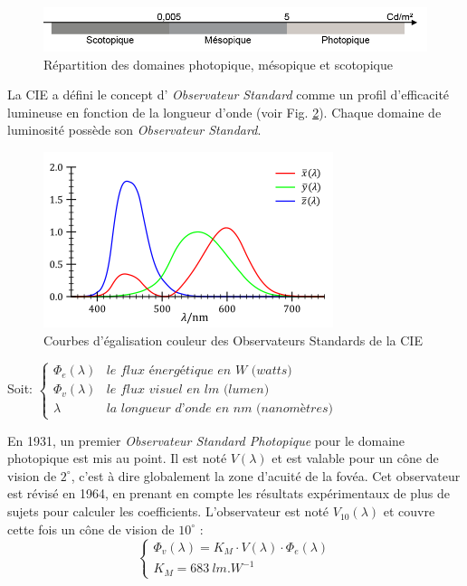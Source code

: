 	\begin{figure}[h]
		\centering
		\includegraphics[scale=1]{Figures/PhotopiqueMesopiqueScotopique}
		\caption{Répartition des domaines photopique, mésopique et scotopique}
		\label{fig:photopic_mesopic_scotopic}
	\end{figure}		
	
	\par La CIE a défini le concept d' \textit{Observateur Standard} comme un profil d'efficacité lumineuse en fonction de la longueur d'onde (voir Fig. \ref{fig:standard_observer_curves}). Chaque domaine de luminosité possède son \textit{Observateur Standard}.
	
	\begin{figure}[h]
		\centering
		\includegraphics[scale=1]{Figures/StandardObsCurves}
		\caption{Courbes d'égalisation couleur des Observateurs Standards de la CIE}
		\label{fig:standard_observer_curves}
	\end{figure}
	
	\par Soit: $\begin{cases}
	\Phi_e(\lambda) & \textit{le flux énergétique en W (watts)}\\
	\Phi_v(\lambda) & \textit{le flux visuel en lm (lumen)}\\
	\lambda & \textit{la longueur d'onde en nm (nanomètres)}
	\end{cases}$
	
	\par En 1931, un premier \textit{Observateur Standard Photopique} pour le domaine photopique est mis au point. Il est noté $V(\lambda)$ et est valable pour un cône de vision de $2^\circ$, c'est à dire globalement la zone d'acuité de la fovéa. Cet observateur est révisé en 1964, en prenant en compte les résultats expérimentaux de plus de sujets pour calculer les coefficients. L'observateur est noté $V_{10}(\lambda)$ et couvre cette fois un cône de vision de $10^\circ$ \citep{le_grand_optique_1972, damelincourt_eclairage_2010}:
	\begin{equation}
		\begin{cases}
		\Phi_v(\lambda) = K_M \cdot V(\lambda) \cdot \Phi_e(\lambda)\\
		K_M = 683~lm.W^{-1}
		\end{cases}
		\label{eq:obs_photopic}
	\end{equation}
	

